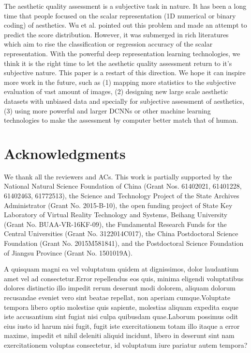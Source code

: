 \documentclass[letterpaper]{article} %
\begin{document}
The aesthetic quality assessment is a subjective task in nature. It has been a long time that people focused on the scalar representation (1D numerical or binary coding) of aesthetics. Wu et al. \cite{WuICCV2011} pointed out this problem and made an attempt to predict the score distribution. However, it was submerged in rich literatures which aim to rise the classification or regression accuracy of the scalar representation. With the powerful deep representation learning technologies, we think it is the right time to let the aesthetic quality assessment return to it's subjective nature. This paper is a restart of this direction. We hope it can inspire more work in the future, such as (1) mapping more statistics to the subjective evaluation of vast amount of images, (2) designing new large scale aesthetic datasets with unbiased data and specially for subjective assessment of aesthetics, (3) using more powerful and larger DCNNs or other machine learning technologies to make the assessment by computer better match that of human.





\section{ Acknowledgments}
We thank all the reviewers and ACs. This work is partially supported by the National Natural Science Foundation of China (Grant Nos. 61402021, 61401228, 61402463, 61772513), the Science and Technology Project of the State Archives Administrator (Grant No. 2015-B-10), the open funding project of State Key Laboratory of Virtual Reality Technology and Systems, Beihang University (Grant No. BUAA-VR-16KF-09), the Fundamental Research Funds for the Central Universities (Grant No. 3122014C017), the China Postdoctoral Science Foundation (Grant No. 2015M581841), and the Postdoctoral Science Foundation of Jiangsu Province (Grant No. 1501019A).


{\small

A quisquam magni ea vel voluptatum quidem at dignissimos, dolor laudantium amet vel ad consectetur.Error repellendus eos quis, minima eligendi voluptatibus dolores distinctio illo impedit rerum deserunt modi dolorem, aliquam dolorum recusandae eveniet vero sint beatae repellat, non aperiam cumque.Voluptate tempora libero optio molestiae quis sapiente, molestias aliquam expedita eaque iste accusantium sint fugiat nisi culpa quibusdam quae.Laborum possimus odit eius iusto id harum nisi fugit, fugit iste exercitationem totam illo itaque a error maxime, impedit et nihil deleniti aliquid incidunt, libero in deserunt sint nam exercitationem voluptas consectetur, id voluptatum iure pariatur autem tempora?\clearpage

}
\end{document}
